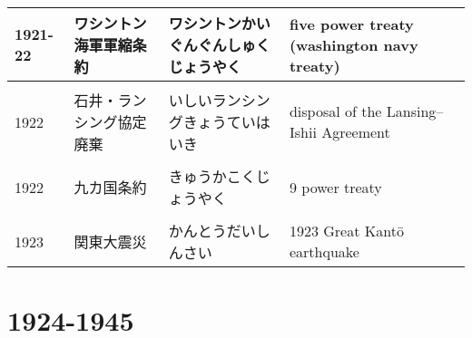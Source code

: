 \documentclass{article}
\begin{document}
\begin{tabular}{p{1.8cm} | p{3.4cm} | p{5.91cm} | p{7.0cm}}
1921-22 & ワシントン海軍軍縮条約 & ワシントンかいぐんぐんしゅくじょうやく & five power treaty (washington navy treaty) \\ \hline \\[-1em]
1922 & 石井・ランシング協定廃棄 & いしいランシングきょうていはいき & disposal of the Lansing–Ishii Agreement \\ \hline \\[-1em]
1922 & 九カ国条約 & きゅうかこくじょうやく & 9 power treaty \\ \hline \\[-1em]
1923 & 関東大震災 &  かんとうだいしんさい & 1923 Great Kantō earthquake
\end{tabular}

\section{1924-1945}
\end{document}
